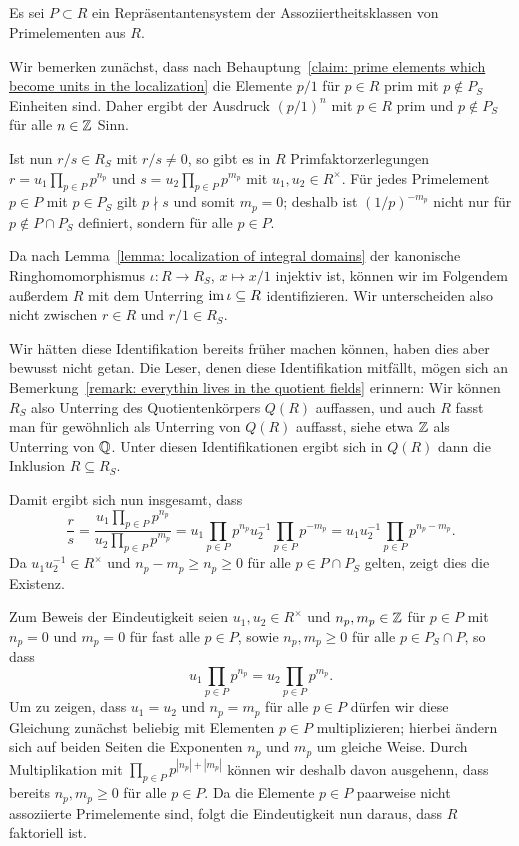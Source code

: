 \documentclass[a4paper,10pt,numbers=noenddot]{scrartcl}
\begin{document}
\subsection{}
Es sei $P \subset R$ ein Repräsentantensystem der Assoziiertheitsklassen von Primelementen aus $R$.

Wir bemerken zunächst, dass nach Behauptung~\ref{claim: prime elements which become units in the localization} die Elemente $p/1$ für $p \in R$ prim mit $p \notin P_S$ Einheiten sind.
Daher ergibt der Ausdruck $(p/1)^n$ mit $p \in R$ prim und $p \notin P_S$ für alle $n \in \mathbb{Z}$ Sinn.

Ist nun $r/s \in R_S$ mit $r/s \neq 0$, so gibt es in $R$ Primfaktorzerlegungen $r = u_1 \prod_{p \in P} p^{n_p}$ und $s = u_2 \prod_{p \in P} p^{m_p}$ mit $u_1, u_2 \in R^\times$.
Für jedes Primelement $p \in P$ mit $p \in P_S$ gilt $p \nmid s$ und somit $m_p = 0$;
deshalb ist $(1/p)^{-m_p}$ nicht nur für $p \notin P \cap P_S$ definiert, sondern für alle $p \in P$.

Da nach Lemma~\ref{lemma: localization of integral domains} der kanonische Ringhomomorphismus $\iota \colon R \to R_S$, $x \mapsto x/1$ injektiv ist, können wir im Folgendem außerdem $R$ mit dem Unterring $\operatorname{im} \iota \subseteq R$ identifizieren.
Wir unterscheiden also nicht zwischen $r \in R$ und $r/1 \in R_S$.

\begin{remark}
  Wir hätten diese Identifikation bereits früher machen können, haben dies aber bewusst nicht getan.
  Die Leser, denen diese Identifikation mitfällt, mögen sich an Bemerkung~\ref{remark: everythin lives in the quotient fields} erinnern:
  Wir können $R_S$ also Unterring des Quotientenkörpers $Q(R)$ auffassen, und auch $R$ fasst man für gewöhnlich als Unterring von $Q(R)$ auffasst, siehe etwa $\mathbb{Z}$ als Unterring von $\mathbb{Q}$.
  Unter diesen Identifikationen ergibt sich in $Q(R)$ dann die Inklusion $R \subseteq R_S$.
\end{remark}

Damit ergibt sich nun insgesamt, dass
\[
    \frac{r}{s}
  = \frac{u_1 \prod_{p \in P} p^{n_p}}{u_2 \prod_{p \in P} p^{m_p}}
  = u_1 \prod_{p \in P} p^{n_p} u_2^{-1} \prod_{p \in P} p^{-m_p}
  = u_1 u_2^{-1} \prod_{p \in P} p^{n_p - m_p}.
\]
Da $u_1 u_2^{-1} \in R^\times$ und $n_p - m_p \geq n_p \geq 0$ für alle $p \in P \cap P_S$ gelten, zeigt dies die Existenz.

Zum Beweis der Eindeutigkeit seien $u_1, u_2 \in R^\times$ und $n_p, m_p \in \mathbb{Z}$ für $p \in P$ mit $n_p = 0$ und $m_p = 0$ für fast alle $p \in P$, sowie $n_p, m_p \geq 0$ für alle $p \in P_S \cap P$, so dass
\[
    u_1 \prod_{p \in P} p^{n_p}
  = u_2 \prod_{p \in P} p^{m_p}.
\]
Um zu zeigen, dass $u_1 = u_2$ und $n_p = m_p$ für alle $p \in P$ dürfen wir diese Gleichung zunächst beliebig mit Elementen $p \in P$ multiplizieren; hierbei ändern sich auf beiden Seiten die Exponenten $n_p$ und $m_p$ um gleiche Weise.
Durch Multiplikation mit $\prod_{p \in P} p^{|n_p| + |m_p|}$ können wir deshalb davon ausgehenn, dass bereits $n_p, m_p \geq 0$ für alle $p \in P$.
Da die Elemente $p \in P$ paarweise nicht assoziierte Primelemente sind, folgt die Eindeutigkeit nun daraus, dass $R$ faktoriell ist.
\end{document}

